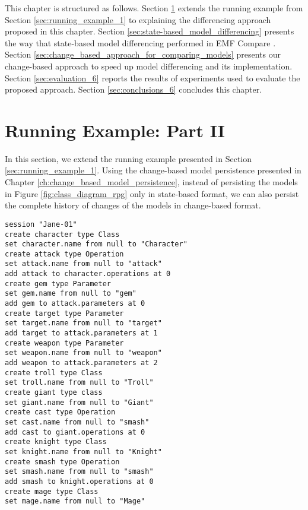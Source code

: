 This chapter is structured as follows.
Section \ref{sec:runnnig_example_continue} extends the running example from Section \ref{sec:running_example_1} to explaining the differencing approach proposed in this chapter.
Section \ref{sec:state-based_model_differencing} presents the way that state-based model differencing performed in EMF Compare \cite{emfcompare2018developer}.
Section \ref{sec:change_based_approach_for_comparing_models} presents our change-based approach to speed up model differencing and its implementation.
Section \ref{sec:evaluation_6} reports the results of experiments used to evaluate the proposed approach. Section \ref{sec:conclusions_6} concludes this chapter.

\section{Running Example: Part II}
\label{sec:runnnig_example_continue}
In this section, we extend the running example presented in Section \ref{sec:running_example_1}. Using the change-based model persistence presented in Chapter \ref{ch:change_based_model_persistence}, instead of persisting the models in Figure \ref{fig:class_diagram_rpg} only in state-based format, we can also persist the complete history of changes of the models in change-based format.

\vspace{-20pt}
\begin{lstlisting}[style=eol,caption={Change-based representation of the original version in Figure \ref{fig:class_diagram_origin}.},label=lst:cbp_origin]
session "Jane-01"
create character type Class
set character.name from null to "Character"
create attack type Operation
set attack.name from null to "attack"
add attack to character.operations at 0
create gem type Parameter
set gem.name from null to "gem"
add gem to attack.parameters at 0
create target type Parameter
set target.name from null to "target"
add target to attack.parameters at 1
create weapon type Parameter
set weapon.name from null to "weapon"
add weapon to attack.parameters at 2
create troll type Class
set troll.name from null to "Troll"
create giant type class
set giant.name from null to "Giant"
create cast type Operation
set cast.name from null to "smash"
add cast to giant.operations at 0
create knight type Class
set knight.name from null to "Knight"
create smash type Operation
set smash.name from null to "smash"
add smash to knight.operations at 0
create mage type Class
set mage.name from null to "Mage"
\end{lstlisting}

